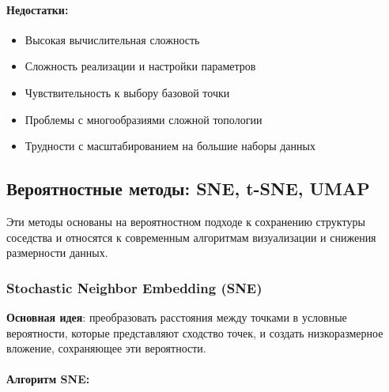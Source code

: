 \documentclass[a4paper,12pt]{article}
\begin{document}
\paragraph{Недостатки:}
\begin{itemize}
    \item Высокая вычислительная сложность
    \item Сложность реализации и настройки параметров
    \item Чувствительность к выбору базовой точки
    \item Проблемы с многообразиями сложной топологии
    \item Трудности с масштабированием на большие наборы данных
\end{itemize}

\subsection{Вероятностные методы: SNE, t-SNE, UMAP}

Эти методы основаны на вероятностном подходе к сохранению структуры соседства и относятся к современным алгоритмам визуализации и снижения размерности данных.

\subsubsection{Stochastic Neighbor Embedding (SNE)}

\textbf{Основная идея}: преобразовать расстояния между точками в условные вероятности, которые представляют сходство точек, и создать низкоразмерное вложение, сохраняющее эти вероятности.

\paragraph{Алгоритм SNE:}
\end{document}
